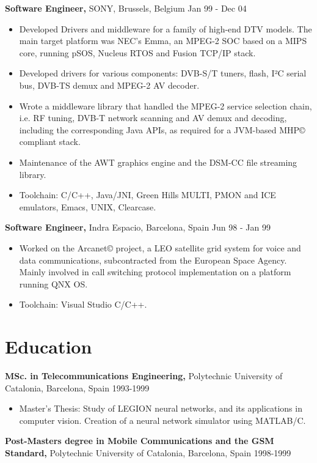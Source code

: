 \documentclass[margin]{res}
\begin{document}
\begin{resume}
{\bf Software Engineer,} SONY, Brussels, Belgium \hfill  Jan 99 - Dec 04
\begin{itemize} \itemsep -2pt %
\item Developed Drivers and middleware for a family of high-end DTV models. The main target platform was NEC’s Emma, an MPEG-2 SOC based on a MIPS core, running pSOS, Nucleus RTOS and Fusion TCP/IP stack.
\item Developed drivers for various components: DVB-S/T tuners, flash, I²C serial bus, DVB-TS demux and MPEG-2 AV decoder. 
\item Wrote a middleware library that handled the MPEG-2 service selection chain, i.e. RF tuning, DVB-T network scanning and AV demux and decoding, including the corresponding Java APIs, as required for a JVM-based MHP© compliant stack.
\item Maintenance of the AWT graphics engine and the DSM-CC file streaming library.
\item Toolchain: C/C++, Java/JNI, Green Hills MULTI, PMON and ICE emulators, Emacs, UNIX, Clearcase.
\end{itemize}

{\bf Software Engineer,} Indra Espacio, Barcelona, Spain \hfill  Jun 98 - Jan 99
\begin{itemize} \itemsep -2pt %
\item Worked on the Arcanet© project, a LEO satellite grid system for voice and data communications, subcontracted from the European Space Agency. Mainly involved in call switching protocol implementation on a platform running QNX OS. 
\item Toolchain: Visual Studio C/C++.
\end{itemize}

\section{Education} 
{ \bf MSc. in Telecommunications Engineering, } Polytechnic University of Catalonia, Barcelona, Spain \hfill 1993-1999
\begin{itemize} \itemsep -2pt
\item Master’s Thesis: Study of LEGION neural networks, and its applications in computer vision. Creation of a neural network simulator using MATLAB/C.
\end{itemize}

{ \bf Post-Masters degree in Mobile Communications and the GSM Standard, } Polytechnic University of Catalonia, Barcelona, Spain \hfill 1998-1999


\end{resume}
\end{document}
